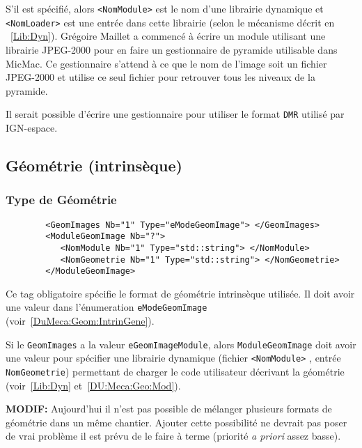 S'il est sp\'ecifi\'e,  alors {\tt <NomModule>} est le nom d'une
librairie dynamique et {\tt <NomLoader>} est une entr\'ee dans cette
librairie (selon le m\'ecanisme d\'ecrit en ~\ref{Lib:Dyn}).
Gr\'egoire Maillet a commenc\'e \`a \'ecrire un module 
utilisant une librairie  JPEG-2000 pour en faire un gestionnaire
de pyramide utilisable dans MicMac. Ce gestionnaire s'attend 
\`a ce que le nom de l'image soit un fichier JPEG-2000 et
utilise ce seul fichier pour retrouver tous les niveaux de
la pyramide.

Il serait possible d'\'ecrire une gestionnaire pour utiliser
le format {\tt DMR} utilis\'e par IGN-espace.



\subsection{G\'eom\'etrie (intrins\`eque)}


\subsubsection{Type de G\'eom\'etrie}

\begin{verbatim}
        <GeomImages Nb="1" Type="eModeGeomImage"> </GeomImages>
        <ModuleGeomImage Nb="?">            
           <NomModule Nb="1" Type="std::string"> </NomModule>
           <NomGeometrie Nb="1" Type="std::string"> </NomGeometrie>    
        </ModuleGeomImage>
\end{verbatim}

Ce tag obligatoire sp\'ecifie le format de g\'eom\'etrie intrins\`eque
utilis\'ee. Il doit avoir une valeur dans l'\'enumeration {\tt eModeGeomImage}
(voir~\ref{DuMeca:Geom:IntrinGene}).

Si le {\tt GeomImages} a la valeur {\tt eGeomImageModule}, alors
{\tt ModuleGeomImage} doit avoir une valeur pour sp\'ecifier
une librairie dynamique (fichier {\tt <NomModule>} , 
entr\'ee {\tt NomGeometrie}) permettant de charger le code
utilisateur d\'ecrivant la g\'eom\'etrie (voir~\ref{Lib:Dyn}
et~\ref{DU:Meca:Geo:Mod}).

{\bf MODIF:} Aujourd'hui il n'est pas possible de m\'elanger plusieurs
formats de g\'eom\'etrie dans un m\^eme chantier. Ajouter cette 
possibilit\'e ne devrait pas poser de vrai probl\`eme  il est
pr\'evu de le faire \`a terme (priorit\'e \emph{a priori} assez
basse).



